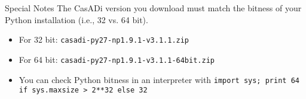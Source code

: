 \documentclass[xcolor=dvipsnames]{beamer}
\begin{document}
\newcommand{\winsixtyfour}[1]{\href{https://sourceforge.net/projects/casadi/files/CasADi/commits/de2f632/windows/}{\textcolor{blue}{\footnotesize \texttt{#1}}}}
\begin{frame}[label=specialnotes]{Special Notes}
    The CasADi version you download must match the bitness of your Python installation (i.e., 32 vs. 64 bit).
    \begin{itemize}
        \item For 32 bit: \texttt{casadi-py27-np1.9.1-v3.1.1.zip}
        \item For 64 bit: \texttt{casadi-py27-np1.9.1-v3.1.1-64bit.zip}
        \item You can check Python bitness in an interpreter with \lstinline[style=python]!import sys; print 64 if sys.maxsize > 2**32 else 32!
    \end{itemize}
\end{frame}
\end{document}
